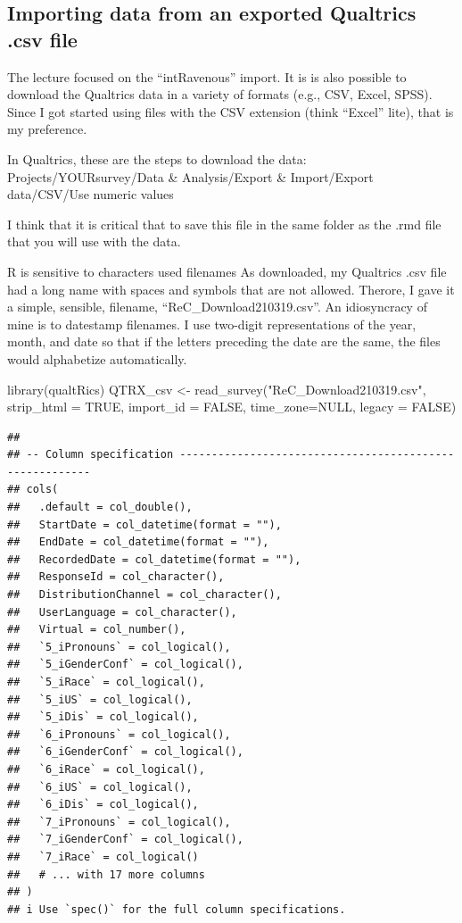 \documentclass[
  11pt,
]{book}
\newenvironment{Shaded}{\begin{snugshade}}{\end{snugshade}}
\newcommand{\AttributeTok}[1]{\textcolor[rgb]{0.77,0.63,0.00}{#1}}
\newcommand{\ConstantTok}[1]{\textcolor[rgb]{0.00,0.00,0.00}{#1}}
\newcommand{\FunctionTok}[1]{\textcolor[rgb]{0.00,0.00,0.00}{#1}}
\newcommand{\NormalTok}[1]{#1}
\newcommand{\OtherTok}[1]{\textcolor[rgb]{0.56,0.35,0.01}{#1}}
\newcommand{\StringTok}[1]{\textcolor[rgb]{0.31,0.60,0.02}{#1}}
\begin{document}
\hypertarget{importing-data-from-an-exported-qualtrics-.csv-file}{%
\subsection{Importing data from an exported Qualtrics .csv file}\label{importing-data-from-an-exported-qualtrics-.csv-file}}

The lecture focused on the ``intRavenous'' import. It is is also possible to download the Qualtrics data in a variety of formats (e.g., CSV, Excel, SPSS). Since I got started using files with the CSV extension (think ``Excel'' lite), that is my preference.

In Qualtrics, these are the steps to download the data: Projects/YOURsurvey/Data \& Analysis/Export \& Import/Export data/CSV/Use numeric values

I think that it is critical that to save this file in the same folder as the .rmd file that you will use with the data.

R is sensitive to characters used filenames As downloaded, my Qualtrics .csv file had a long name with spaces and symbols that are not allowed. Therore, I gave it a simple, sensible, filename, ``ReC\_Download210319.csv''. An idiosyncracy of mine is to datestamp filenames. I use two-digit representations of the year, month, and date so that if the letters preceding the date are the same, the files would alphabetize automatically.

\begin{Shaded}
\begin{Highlighting}[]
\FunctionTok{library}\NormalTok{(qualtRics)}
\NormalTok{QTRX\_csv }\OtherTok{\textless{}{-}} \FunctionTok{read\_survey}\NormalTok{(}\StringTok{"ReC\_Download210319.csv"}\NormalTok{, }\AttributeTok{strip\_html =} \ConstantTok{TRUE}\NormalTok{, }\AttributeTok{import\_id =} \ConstantTok{FALSE}\NormalTok{, }\AttributeTok{time\_zone=}\ConstantTok{NULL}\NormalTok{, }\AttributeTok{legacy =} \ConstantTok{FALSE}\NormalTok{)}
\end{Highlighting}
\end{Shaded}

\begin{verbatim}
## 
## -- Column specification --------------------------------------------------------
## cols(
##   .default = col_double(),
##   StartDate = col_datetime(format = ""),
##   EndDate = col_datetime(format = ""),
##   RecordedDate = col_datetime(format = ""),
##   ResponseId = col_character(),
##   DistributionChannel = col_character(),
##   UserLanguage = col_character(),
##   Virtual = col_number(),
##   `5_iPronouns` = col_logical(),
##   `5_iGenderConf` = col_logical(),
##   `5_iRace` = col_logical(),
##   `5_iUS` = col_logical(),
##   `5_iDis` = col_logical(),
##   `6_iPronouns` = col_logical(),
##   `6_iGenderConf` = col_logical(),
##   `6_iRace` = col_logical(),
##   `6_iUS` = col_logical(),
##   `6_iDis` = col_logical(),
##   `7_iPronouns` = col_logical(),
##   `7_iGenderConf` = col_logical(),
##   `7_iRace` = col_logical()
##   # ... with 17 more columns
## )
## i Use `spec()` for the full column specifications.
\end{verbatim}
\end{document}
